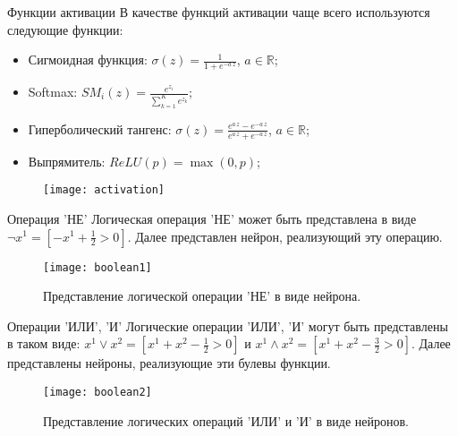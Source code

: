 \documentclass[11pt]{beamer}
\begin{document}
	\begin{frame}{Функции активации}
		В качестве функций активации чаще всего используются следующие функции:
		\begin{itemize}
			\item Сигмоидная функция: $\sigma(z) = \frac{1}{1+e^{-a\,z}}$, $a \in \mathbb{R}$;
			\item Softmax: $SM_i(z)  = \frac{e^{z_i}}{\sum_{k=1}^{K}e^{z_k}}$;
			\item Гиперболический тангенс: $\sigma(z) = \frac{e^{a\,z} - e^{-a\,z}}{e^{a\,z} + e^{-a\,z}}$, $a \in \mathbb{R}$;
			\item Выпрямитель: $ReLU(p) = \max (0,p)$;
		\end{itemize}
			

		\begin{figure}[hhh!]
			\begin{center}
				\texttt{[image: activation]}
			\end{center}
			\vspace{-5mm}
		\end{figure}
		
	\end{frame}

	\begin{frame}{Операция 'НЕ'}
		Логическая операция 'НЕ' может быть представлена в виде $\lnot x^1 = [-x^1+\frac{1}{2}>0]$. Далее представлен нейрон, реализующий эту операцию.
		
		\begin{figure}[H]
			\begin{center}
					\texttt{[image: boolean1]}
					\caption{Представление логической операции 'НЕ' в виде нейрона.}
					\label{bool1}
			\end{center}
		\end{figure}
	\end{frame}

	\begin{frame}{Операции 'ИЛИ', 'И'}
		Логические операции 'ИЛИ', 'И' могут быть представлены в таком виде: $x^1 \lor x^2 = [x^1+x^2 -\frac{1}{2}>0]$ и $x^1 \wedge x^2 = [x^1+x^2 -\frac{3}{2}>0]$. Далее представлены нейроны, реализующие эти булевы функции.
		
		\begin{figure}[H]
			\begin{center}
					\texttt{[image: boolean2]}
					\caption{Представление логических операций 'ИЛИ' и 'И' в виде нейронов.}
					\label{bool2}
			\end{center}
		\end{figure}
	\end{frame}
\end{document}
